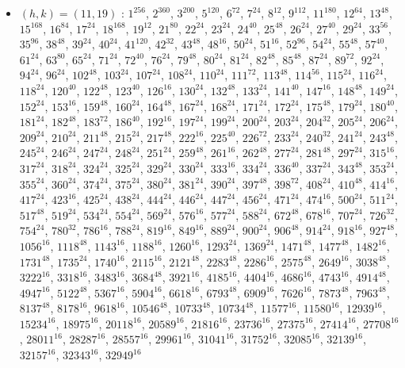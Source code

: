 \begin{itemize}
\item $(h,k)=(11,19)$ : $1^{256}$, $2^{360}$, $3^{200}$, $5^{120}$, $6^{72}$, $7^{24}$, $8^{12}$, $9^{112}$, $11^{180}$, $12^{64}$, $13^{48}$, $15^{168}$, $16^{84}$, $17^{24}$, $18^{168}$, $19^{12}$, $21^{80}$, $22^{24}$, $23^{24}$, $24^{40}$, $25^{48}$, $26^{24}$, $27^{40}$, $29^{24}$, $33^{56}$, $35^{96}$, $38^{48}$, $39^{24}$, $40^{24}$, $41^{120}$, $42^{32}$, $43^{48}$, $48^{16}$, $50^{24}$, $51^{16}$, $52^{96}$, $54^{24}$, $55^{48}$, $57^{40}$, $61^{24}$, $63^{80}$, $65^{24}$, $71^{24}$, $72^{40}$, $76^{24}$, $79^{48}$, $80^{24}$, $81^{24}$, $82^{48}$, $85^{48}$, $87^{24}$, $89^{72}$, $92^{24}$, $94^{24}$, $96^{24}$, $102^{48}$, $103^{24}$, $107^{24}$, $108^{24}$, $110^{24}$, $111^{72}$, $113^{48}$, $114^{56}$, $115^{24}$, $116^{24}$, $118^{24}$, $120^{40}$, $122^{48}$, $123^{40}$, $126^{16}$, $130^{24}$, $132^{48}$, $133^{24}$, $141^{40}$, $147^{16}$, $148^{48}$, $149^{24}$, $152^{24}$, $153^{16}$, $159^{48}$, $160^{24}$, $164^{48}$, $167^{24}$, $168^{24}$, $171^{24}$, $172^{24}$, $175^{48}$, $179^{24}$, $180^{40}$, $181^{24}$, $182^{48}$, $183^{72}$, $186^{40}$, $192^{16}$, $197^{24}$, $199^{24}$, $200^{24}$, $203^{24}$, $204^{32}$, $205^{24}$, $206^{24}$, $209^{24}$, $210^{24}$, $211^{48}$, $215^{24}$, $217^{48}$, $222^{16}$, $225^{40}$, $226^{72}$, $233^{24}$, $240^{32}$, $241^{24}$, $243^{48}$, $245^{24}$, $246^{24}$, $247^{24}$, $248^{24}$, $251^{24}$, $259^{48}$, $261^{16}$, $262^{48}$, $277^{24}$, $281^{48}$, $297^{24}$, $315^{16}$, $317^{24}$, $318^{24}$, $324^{24}$, $325^{24}$, $329^{24}$, $330^{24}$, $333^{16}$, $334^{24}$, $336^{40}$, $337^{24}$, $343^{48}$, $353^{24}$, $355^{24}$, $360^{24}$, $374^{24}$, $375^{24}$, $380^{24}$, $381^{24}$, $390^{24}$, $397^{48}$, $398^{72}$, $408^{24}$, $410^{48}$, $414^{16}$, $417^{24}$, $423^{16}$, $425^{24}$, $438^{24}$, $444^{24}$, $446^{24}$, $447^{24}$, $456^{24}$, $471^{24}$, $474^{16}$, $500^{24}$, $511^{24}$, $517^{48}$, $519^{24}$, $534^{24}$, $554^{24}$, $569^{24}$, $576^{16}$, $577^{24}$, $588^{24}$, $672^{48}$, $678^{16}$, $707^{24}$, $726^{32}$, $754^{24}$, $780^{32}$, $786^{16}$, $788^{24}$, $819^{16}$, $849^{16}$, $889^{24}$, $900^{24}$, $906^{48}$, $914^{24}$, $918^{16}$, $927^{48}$, $1056^{16}$, $1118^{48}$, $1143^{16}$, $1188^{16}$, $1260^{16}$, $1293^{24}$, $1369^{24}$, $1471^{48}$, $1477^{48}$, $1482^{16}$, $1731^{48}$, $1735^{24}$, $1740^{16}$, $2115^{16}$, $2121^{48}$, $2283^{48}$, $2286^{16}$, $2575^{48}$, $2649^{16}$, $3038^{48}$, $3222^{16}$, $3318^{16}$, $3483^{16}$, $3684^{48}$, $3921^{16}$, $4185^{16}$, $4404^{16}$, $4686^{16}$, $4743^{16}$, $4914^{48}$, $4947^{16}$, $5122^{48}$, $5367^{16}$, $5904^{16}$, $6618^{16}$, $6793^{48}$, $6909^{16}$, $7626^{16}$, $7873^{48}$, $7963^{48}$, $8137^{48}$, $8178^{16}$, $9618^{16}$, $10546^{48}$, $10733^{48}$, $10734^{48}$, $11577^{16}$, $11580^{16}$, $12939^{16}$, $15234^{16}$, $18975^{16}$, $20118^{16}$, $20589^{16}$, $21816^{16}$, $23736^{16}$, $27375^{16}$, $27414^{16}$, $27708^{16}$, $28011^{16}$, $28287^{16}$, $28557^{16}$, $29961^{16}$, $31041^{16}$, $31752^{16}$, $32085^{16}$, $32139^{16}$, $32157^{16}$, $32343^{16}$, $32949^{16}$

\end{itemize}
